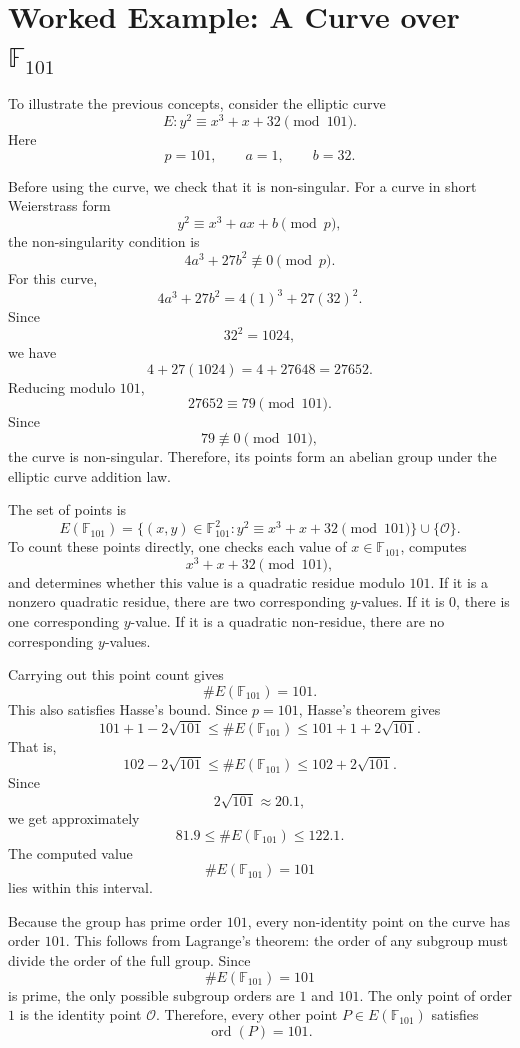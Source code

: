 \documentclass[12pt,a4paper]{article}
\begin{document}
\section{Worked Example: A Curve over \texorpdfstring{\(\mathbb{F}_{101}\)}{F101}}

To illustrate the previous concepts, consider the elliptic curve
\[ E: y^2 \equiv x^3+x+32 \pmod {101}. \]
Here
\[p=101,\qquad a=1,\qquad b=32.\]

Before using the curve, we check that it is non-singular. For a curve in short Weierstrass form
\[y^2\equiv x^3+ax+b\pmod p,\]
the non-singularity condition is
\[4a^3+27b^2\not\equiv 0\pmod p.\]
For this curve,
\[4a^3+27b^2=4(1)^3+27(32)^2.\]
Since
\[32^2=1024,\]
we have
\[4+27(1024)=4+27648=27652.\]
Reducing modulo \(101\),
\[27652\equiv 79\pmod {101}.\]
Since
\[79\not\equiv 0\pmod {101},\]
the curve is non-singular. Therefore, its points form an abelian group under the elliptic curve addition law.

The set of points is
\[E(\mathbb{F}_{101})=\{(x,y)\in\mathbb{F}_{101}^2:y^2\equiv x^3+x+32\pmod {101}\}\cup\{\mathcal{O}\}.\]
To count these points directly, one checks each value of \(x\in\mathbb{F}_{101}\), computes
\[x^3+x+32\pmod {101},\]
and determines whether this value is a quadratic residue modulo \(101\). If it is a nonzero quadratic residue, there are two corresponding \(y\)-values. If it is \(0\), there is one corresponding \(y\)-value. If it is a quadratic non-residue, there are no corresponding \(y\)-values.

Carrying out this point count gives
\[\#E(\mathbb{F}_{101})=101.\]
This also satisfies Hasse's bound. Since \(p=101\), Hasse's theorem gives
\[101+1-2\sqrt{101}\leq\#E(\mathbb{F}_{101})\leq101+1+2\sqrt{101}.\]
That is,
\[102-2\sqrt{101}\leq\#E(\mathbb{F}_{101})\leq102+2\sqrt{101}.\]
Since
\[2\sqrt{101}\approx 20.1,\]
we get approximately
\[81.9\leq \#E(\mathbb{F}_{101})\leq 122.1.\]
The computed value
\[\#E(\mathbb{F}_{101})=101\]
lies within this interval.

Because the group has prime order \(101\), every non-identity point on the curve has order \(101\). This follows from Lagrange's theorem: the order of any subgroup must divide the order of the full group. Since
\[\#E(\mathbb{F}_{101})=101\]
is prime, the only possible subgroup orders are \(1\) and \(101\). The only point of order \(1\) is the identity point \(\mathcal{O}\). Therefore, every other point \(P\in E(\mathbb{F}_{101})\) satisfies
\[\operatorname{ord}(P)=101.\]
\end{document}
